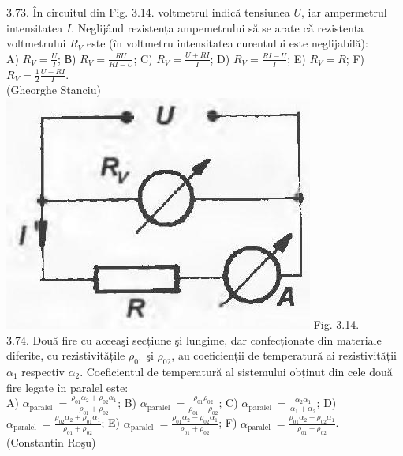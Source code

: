 \documentclass[10pt]{article}
\begin{document}
3.73. În circuitul din Fig. 3.14. voltmetrul indică tensiunea $U$, iar ampermetrul intensitatea $I$. Neglijând rezistența ampemetrului să se arate cǎ rezistența voltmetrului $R_{V}$ este (în voltmetru intensitatea curentului este neglijabilă):\\ A) $R_{V}=\frac{U}{I}$; В) $R_{V}=\frac{R U}{R I-U}$; C) $R_{V}=\frac{U+R I}{I}$; D) $R_{V}=\frac{R I-U}{I}$; E) $R_{V}=R$; F) $R_{V}=\frac{1}{2} \frac{U-R I}{I}$.\\ (Gheorghe Stanciu)\\ \includegraphics[max width=\textwidth, center]{2025_07_01_5b3ff9fa0d508c8e9f17g-159(1)} Fig. 3.14.\\

3.74. Două fire cu aceeaşi secțiune şi lungime, dar confecționate din materiale diferite, cu rezistivitățile $\rho_{01}$ şi $\rho_{02}$, au coeficienții de temperatură ai rezistivității $\alpha_{1}$ respectiv $\alpha_{2}$. Coeficientul de temperatură al sistemului obținut din cele două fire legate în paralel este:\\ A) $\alpha_{\text {paralel }}=\frac{\rho_{01} \alpha_{2}+\rho_{02} \alpha_{1}}{\rho_{01}+\rho_{02}}$; B) $\alpha_{\text {paralel }}=\frac{\rho_{01} \rho_{02}}{\rho_{01}+\rho_{02}}$; C) $\alpha_{\text {paralel }}=\frac{\alpha_{2} \alpha_{1}}{\alpha_{1}+\alpha_{2}}$; D) $\alpha_{\text {paralel }}=\frac{\rho_{02} \alpha_{2}+\rho_{01} \alpha_{1}}{\rho_{01}+\rho_{02}}$; E) $\alpha_{\text {paralel }}=\frac{\rho_{01} \alpha_{2}-\rho_{02} \alpha_{1}}{\rho_{01}+\rho_{02}}$; F) $\alpha_{\text {paralel }}=\frac{\rho_{01} \alpha_{2}-\rho_{02} \alpha_{1}}{\rho_{01}-\rho_{02}}$.\\ (Constantin Roşu)\\
\end{document}
